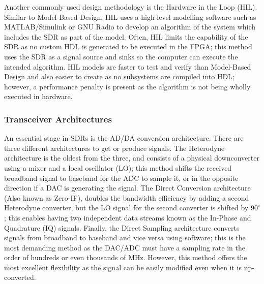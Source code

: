 \documentclass[12pt,a4paper]{report}
\begin{document}
Another commonly used design methodology is the Hardware in the Loop (HIL). Similar to Model-Based Design, HIL uses a high-level modelling software such as MATLAB/Simulink or GNU Radio to develop an algorithm of the system which includes the SDR as part of the model. Often, HIL limits the capability of the SDR as no custom HDL is generated to be executed in the FPGA; this method uses the SDR as a signal source and sinks so the computer can execute the intended algorithm. HIL models are faster to test and verify than Model-Based Design and also easier to create as no subsystems are compiled into HDL; however, a performance penalty is present as the algorithm is not being wholly executed in hardware.

\subsubsection{Transceiver Architectures} \label{back:sdr:hdwr:arch}
An essential stage in SDRs is the AD/DA conversion architecture. There are three different architectures to get or produce signals. The Heterodyne architecture is the oldest from the three, and consists of a physical downconverter using a mixer and a local oscillator (LO); this method shifts the received broadband signal to baseband for the  ADC to sample it, or in the opposite direction if a DAC is generating the signal. The Direct Conversion architecture (Also known as Zero-IF), doubles the bandwidth efficiency by adding a second Heterodyne converter, but the LO signal for the second converter is shifted by $90^\circ$; this enables having two independent data streams known as the In-Phase and Quadrature (IQ) signals. Finally, the Direct Sampling architecture converts signals from broadband to baseband and vice versa using software; this is the most demanding method as the DAC/ADC must have a sampling rate in the order of hundreds or even thousands of MHz. However, this method offers the most excellent flexibility as the signal can be easily modified even when it is up-converted. 
\end{document}
